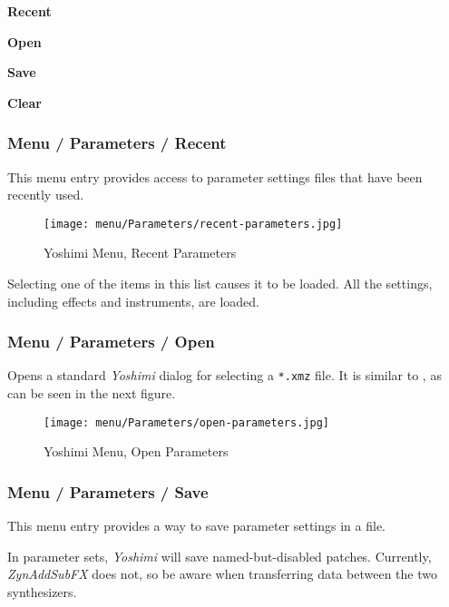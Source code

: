    \begin{enumber}
      \item \textbf{Recent}
      \item \textbf{Open}
      \item \textbf{Save}
      \item \textbf{Clear}
   \end{enumber}

\subsubsection{Menu / Parameters / Recent}
\label{subsubsec:menu_parameters_recent}

   This menu entry provides access to parameter settings files that have
   been recently used.

\begin{figure}[H]
   \centering 
   \texttt{[image: menu/Parameters/recent-parameters.jpg]}
   \caption{Yoshimi Menu, Recent Parameters}
   \label{fig:yoshimi_menu_recent_parameters}
\end{figure}

   Selecting one of the items in this list causes it to be loaded.
   All the settings, including effects and instruments, are loaded.

\subsubsection{Menu / Parameters / Open}
\label{subsubsec:menu_parameters_open}

   Opens a standard \textsl{Yoshimi} dialog for selecting a
   \texttt{*.xmz} file.
   It is similar to
   ,
   as can be seen in the next figure.

\begin{figure}[H]
   \centering 
   \texttt{[image: menu/Parameters/open-parameters.jpg]}
   \caption{Yoshimi Menu, Open Parameters}
   \label{fig:yoshimi_menu_open_parameters}
\end{figure}

\subsubsection{Menu / Parameters / Save}
\label{subsubsec:menu_parameters_save}

   This menu entry provides a way to save parameter settings in
   a file.

   In parameter sets, \textsl{Yoshimi} will save named-but-disabled patches.
   Currently, \textsl{ZynAddSubFX} does not, so be aware when transferring
   data between the two synthesizers.

